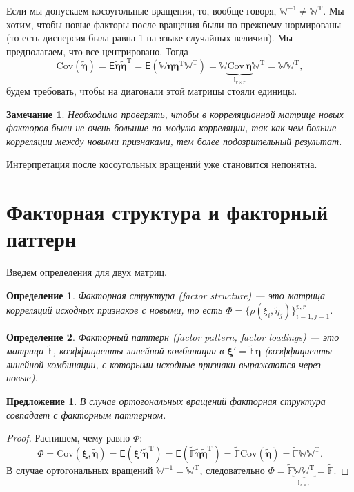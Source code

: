 \documentclass[specialist, 12pt,
subf, %
href, colorlinks=true,
substylefile = spbu.rtx,
]{disser}
\newtheorem{proposition}{Предложение}
\newtheorem{definition}{Определение}
\newtheorem{remark}{Замечание}
\begin{document}
Если мы допускаем косоугольные вращения, то, вообще говоря, $\mathbb{W}^{-1}\ne\mathbb{W}^{\mathrm{T}}$. Мы хотим, чтобы новые факторы после вращения были по-прежнему нормированы (то есть дисперсия была равна 1 на языке случайных величин). Мы предполагаем, что все центрировано. Тогда
\begin{equation*}
\text{Cov}(\widetilde{\bm\eta})=\textsf{E}\widetilde{\bm\eta}\widetilde{\bm\eta}^\mathrm{T} = \textsf{E}(\mathbb{W}\bm\eta\bm\eta^\mathrm{T}\mathbb{W}^\mathrm{T}) = \mathbb{W} \underbrace{\text{Cov}\,\bm\eta}_{\mathbb{I}_{r\times r}} \mathbb{W}^\mathrm{T} = \mathbb{W}\mathbb{W}^\mathrm{T},
\end{equation*}
будем требовать, чтобы на диагонали этой матрицы стояли единицы.

\begin{remark}
	Необходимо проверять, чтобы в корреляционной матрице новых факторов были не очень большие по модулю корреляции, так как чем больше корреляции между новыми признаками, тем более подозрительный результат.
\end{remark}

Интерпретация после косоугольных вращений уже становится непонятна.

\newpage
\section{Факторная структура и факторный паттерн}

Введем определения для двух матриц.

\begin{definition}
	Факторная структура (factor structure) --- это матрица корреляций исходных признаков с новыми, то есть $\Phi = \{\rho(\xi_i,\widetilde{\eta}_j)\}_{i=1,j=1}^{p,r}$.
\end{definition}

\begin{definition}
	Факторный паттерн (factor pattern, factor loadings) --- это матрица $\widetilde{\mathbb{F}}$, коэффициенты линейной комбинации в $\bm\xi'=\widetilde{\mathbb{F}}\widetilde{\bm\eta}$ (коэффициенты линейной комбинации, с которыми исходные признаки выражаются через новые).
\end{definition}

\begin{proposition}
	В случае ортогональных вращений факторная структура совпадает с факторным паттерном.
\end{proposition}
\begin{proof}
Распишем, чему равно $\Phi$:
\begin{equation*}
\Phi = \text{Cov}(\bm\xi,\widetilde{\bm\eta})=\textsf{E}(\bm\xi'\widetilde{\bm\eta}^\mathrm{T}) = \textsf{E}(\widetilde{\mathbb{F}}\widetilde{\bm\eta}\widetilde{\bm\eta}^\mathrm{T}) = \widetilde{\mathbb{F}}\text{Cov}(\widetilde{\bm\eta}) =  \widetilde{\mathbb{F}}\mathbb{W}\mathbb{W}^\mathrm{T}.
\end{equation*}
В случае ортогональных вращений $\mathbb{W}^{-1}=\mathbb{W}^{\mathrm{T}}$, следовательно $\Phi = \widetilde{\mathbb{F}}\underbrace{\mathbb{W}\mathbb{W}^\mathrm{T}}_{\mathbb{I}_{r \times r}} = \widetilde{\mathbb{F}}$.
\end{proof}
\end{document}
